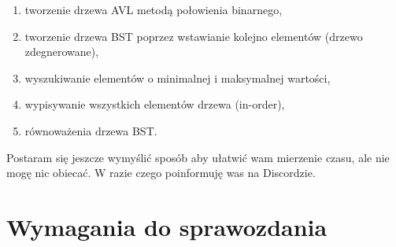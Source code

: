 \begin{enumerate} [label=\putbf{(\alph*)}]
\item tworzenie drzewa AVL metodą połowienia binarnego, 
\item tworzenie drzewa BST poprzez wstawianie kolejno elementów (drzewo zdegnerowane),
\item wyszukiwanie elementów o minimalnej i maksymalnej wartości,
\item wypisywanie wszystkich elementów drzewa (in-order),
\item równoważenia drzewa BST.
\end{enumerate}

Postaram się jeszcze wymyślić sposób aby ułatwić wam mierzenie czasu, ale nie mogę nic obiecać. W razie czego poinformuję was na Discordzie.



\section{Wymagania do sprawozdania}


